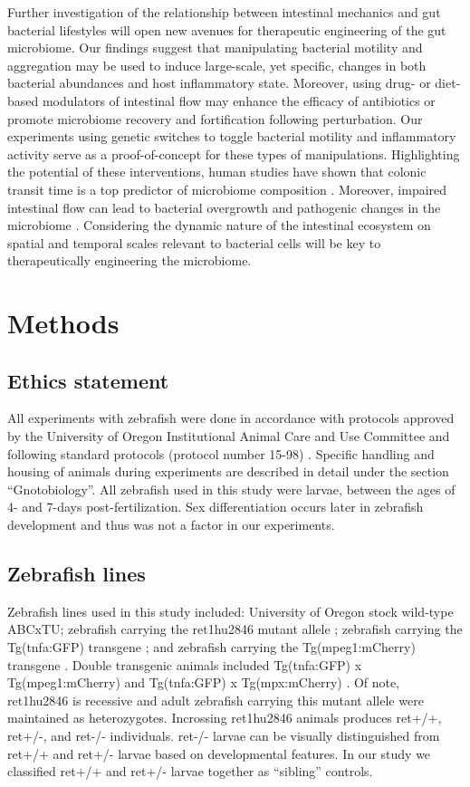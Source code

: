 Further investigation of the relationship between intestinal mechanics and gut bacterial lifestyles will open new avenues for therapeutic engineering of the gut microbiome. Our findings suggest that manipulating bacterial motility and aggregation may be used to induce large-scale, yet specific, changes in both bacterial abundances and host inflammatory state. Moreover, using drug- or diet-based modulators of intestinal flow may enhance the efficacy of antibiotics or promote microbiome recovery and fortification following perturbation. Our experiments using genetic switches to toggle bacterial motility and inflammatory activity serve as a proof-of-concept for these types of manipulations. Highlighting the potential of these interventions, human studies have shown that colonic transit time is a top predictor of microbiome composition \cite{falony_population-level_2016,roager_colonic_2016}. Moreover, impaired intestinal flow can lead to bacterial overgrowth and pathogenic changes in the microbiome \cite{rolig_enteric_2017,heanue_enteric_2007,dukowicz_small_2007}. Considering the dynamic nature of the intestinal ecosystem on spatial and temporal scales relevant to bacterial cells will be key to therapeutically engineering the microbiome. 

\section{Methods}
\subsection{Ethics statement}
All experiments with zebrafish were done in accordance with protocols approved by the University of Oregon Institutional Animal Care and Use Committee and following standard protocols (protocol number 15-98) \cite{westerfield_zebrafish_2007}. Specific handling and housing of animals during experiments are described in detail under the section ``Gnotobiology''. All zebrafish used in this study were larvae, between the ages of 4- and 7-days post-fertilization. Sex differentiation occurs later in zebrafish development and thus was not a factor in our experiments.

\subsection{Zebrafish lines}
Zebrafish lines used in this study included: University of Oregon stock wild-type ABCxTU; zebrafish carrying the ret1hu2846 mutant allele \cite{wiles_host_2016,ganz_image_2018}; zebrafish carrying the Tg(tnfa:GFP) transgene \cite{marjoram_epigenetic_2015}; and zebrafish carrying the Tg(mpeg1:mCherry) transgene \cite{ellett_mpeg1_2011}. Double transgenic animals included Tg(tnfa:GFP) x Tg(mpeg1:mCherry) and Tg(tnfa:GFP) x Tg(mpx:mCherry) \cite{lam_heat_2013}. Of note, ret1hu2846 is recessive and adult zebrafish carrying this mutant allele were maintained as heterozygotes. Incrossing ret1hu2846 animals produces ret+/+, ret+/-, and ret-/- individuals. ret-/- larvae can be visually distinguished from ret+/+ and ret+/- larvae based on developmental features. In our study we classified ret+/+ and ret+/- larvae together as ``sibling'' controls. 


